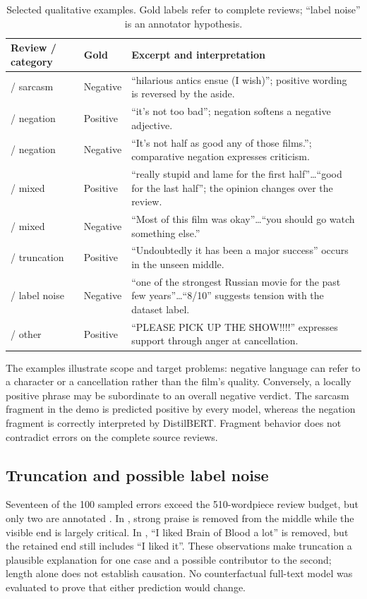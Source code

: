 \begin{table}[htbp]\centering\small
\caption{Selected qualitative examples. Gold labels refer to complete reviews; ``label noise'' is an annotator hypothesis.}\label{tab:error_examples}
\begin{tabularx}{\linewidth}{@{}l l Y@{}}\toprule
Review / category & Gold & Excerpt and interpretation\\\midrule
{} / sarcasm & Negative &
``hilarious antics ensue (I wish)''; positive wording is reversed by the aside.\\
 / negation & Positive &
``it's not too bad''; negation softens a negative adjective.\\
 / negation & Negative &
``It's not half as good any of those films.''; comparative negation expresses criticism.\\
 / mixed & Positive &
``really stupid and lame for the first half''\ldots ``good for the last half''; the opinion changes over the review.\\
 / mixed & Negative &
``Most of this film was okay''\ldots ``you should go watch something else.''\\
 / truncation & Positive &
``Undoubtedly it has been a major success'' occurs in the unseen middle.\\
 / label noise & Negative &
``one of the strongest Russian movie for the past few years''\ldots ``8/10'' suggests tension with the dataset label.\\
 / other & Positive &
``PLEASE PICK UP THE SHOW!!!!'' expresses support through anger at cancellation.\\\bottomrule
\end{tabularx}
\end{table}

The examples illustrate scope and target problems: negative language can refer
to a character or a cancellation rather than the film's quality. Conversely,
a locally positive phrase may be subordinate to an overall negative verdict.
The sarcasm fragment in the demo is predicted positive by every model, whereas
the negation fragment is correctly interpreted by DistilBERT. Fragment behavior
does not contradict errors on the complete source reviews.

\subsection{Truncation and possible label noise}
Seventeen of the 100 sampled errors exceed the 510-wordpiece review budget,
but only two are annotated . In , strong
praise is removed from the middle while the visible end is largely critical.
In , ``I liked Brain of Blood a lot'' is removed, but the
retained end still includes ``I liked it''. These observations make truncation
a plausible explanation for one case and a possible contributor to the second;
length alone does not establish causation. No counterfactual full-text model
was evaluated to prove that either prediction would change.

